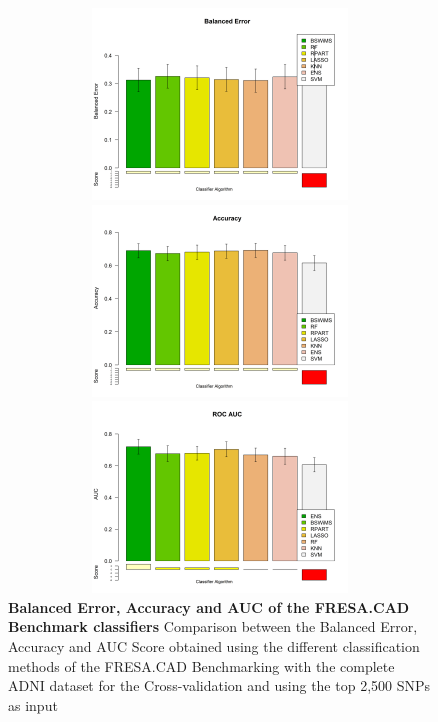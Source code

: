  \begin{figure}[!ht]
\centerline{\includegraphics[width=5in,height=2in]{images/results/fresaBE.png}}
\centerline{\includegraphics[width=5in,height=2in]{images/results/fresaAcc.png}}
\centerline{\includegraphics[width=5in,height=2in]{images/results/fresaAUC.png}}
\caption{{\bf Balanced Error, Accuracy and AUC of the FRESA.CAD Benchmark classifiers} 
Comparison between the Balanced Error, Accuracy and AUC Score obtained using the different classification methods of the FRESA.CAD Benchmarking with the complete ADNI dataset for the Cross-validation and using the top 2,500 SNPs as input}
\label{fig17}
\end{figure}

